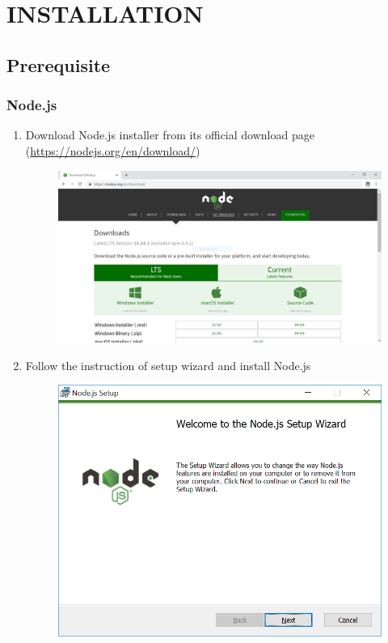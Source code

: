 \chapter{INSTALLATION}
\section{Prerequisite}
\tocless\subsection{Node.js}
\begin{enumerate}
	\item Download Node.js installer from its official download page (\href{https://nodejs.org/en/download/}{https://nodejs.org/en/download/})
	      \begin{center}
	      	\begin{figure}[H]
	      		\centering
	      		\includegraphics[width=0.6\columnwidth]{images/appendixA/Nodejs-download-page.PNG}
	      	\end{figure}
	      \end{center}
	\item Follow the instruction of setup wizard and install Node.js
	      \begin{center}
	      	\begin{figure}[H]
	      		\centering
	      		\includegraphics[width=0.6\columnwidth]{images/appendixA/Nodejs-setup.PNG}

\end{figure}
\end{center}
\end{enumerate}
